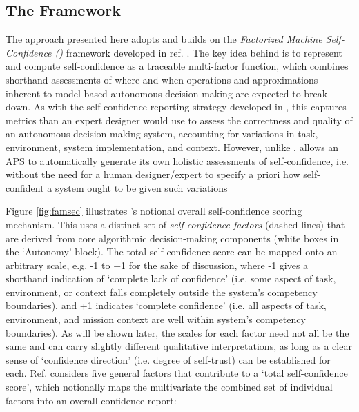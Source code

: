     \subsection{The \famsec{} Framework }
    The approach presented here adopts and builds on the \emph{Factorized Machine Self-Confidence (\famsec)} framework developed in ref. \cite{Aitken2016-cv, Aitken2016-fb}. The key idea behind \famsec{} is to represent and compute self-confidence as a traceable multi-factor function, which combines shorthand assessments of where and when operations and approximations inherent to model-based autonomous decision-making are expected to break down. As with the self-confidence reporting strategy developed in \cite{Hutchins2015-if}, this captures metrics than an expert designer would use to assess the correctness and quality of an autonomous decision-making system, accounting for variations in task, environment, system implementation, and context. However, unlike \cite{Hutchins2015-if}, \famsec{} allows an APS to automatically generate its own holistic assessments of self-confidence, i.e. without the need for a human designer/expert to specify a priori how self-confident a system ought to be given such variations %
    
    Figure \ref{fig:famsec} illustrates \famsec's notional overall self-confidence scoring mechanism. This uses a distinct set of \emph{self-confidence factors} (dashed lines) that are derived from core algorithmic decision-making components (white boxes in the `Autonomy' block). The total self-confidence score can be mapped onto an arbitrary scale, e.g. -1 to +1 for the sake of discussion, where -1 gives a shorthand indication of `complete lack of confidence' (i.e. some aspect of task, environment, or context falls completely outside the system's competency boundaries), and +1 indicates `complete confidence' (i.e. all aspects of task, environment, and mission context are well within system's competency boundaries). As will be shown later, the scales for each factor need not all be the same and can carry slightly different qualitative interpretations, as long as a clear sense of `confidence direction' (i.e. degree of self-trust) can be established for each. 
    Ref. \cite{Aitken2016-cv} considers five general factors that contribute to a `total self-confidence score', which notionally maps the multivariate the combined set of individual factors into an overall confidence report:
    
